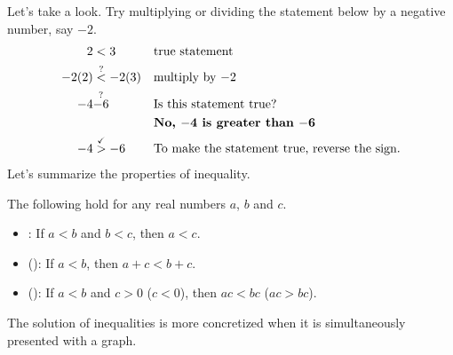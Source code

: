 Let's take a look. Try multiplying or dividing the statement below by a negative number, say $-2$.
\begin{align*}
2&<3 && \text{true statement}\\
-2(2) &\overset{?}{<}-2(3) && \text{multiply by $-2$}\\
-4&\overset{?}{-6} && \text{Is this statement true?}\\
 & && \text{\textbf{No, $\mathbf{-4}$ is greater than $\mathbf{-6}$}}\\
-4 &\overset{\checkmark}{>}-6 && \text{To make the statement true, reverse the sign.}
\end{align*}
Let’s summarize the properties of inequality.
\begin{property}[frametitle={Properties of Inequality}]
The following  hold for any real numbers $a$, $b$ and $c$.
\begin{itemize}
\item {}: If $a<b$ and $b<c$, then $a<c$.
\item {} (): If $a<b$, then $a+c<b+c$.
\item {} (): If $a<b$ and $c>0$ ($c<0$), then $ac<bc$ ($ac>bc$).
\end{itemize}
\end{property}
The solution of inequalities is more concretized when it is simultaneously presented with a graph.

